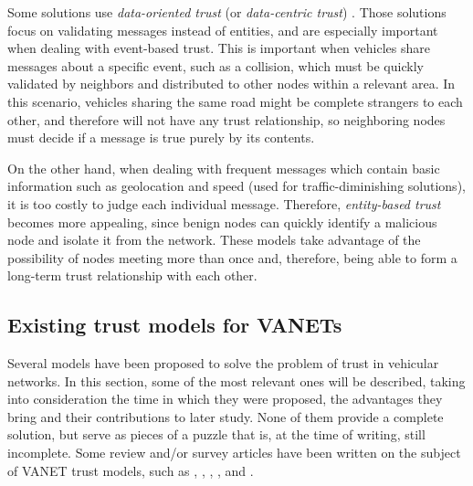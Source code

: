 \documentclass{article}
\begin{document}
Some solutions use \textit{data-oriented trust} (or \textit{data-centric trust}) \cite{raya2008data}.
Those solutions focus on validating messages instead of entities, and are especially important when dealing with event-based trust.
This is important when vehicles share messages about a specific event, such as a collision, which must be quickly validated by neighbors and distributed to other nodes within a relevant area.
In this scenario, vehicles sharing the same road might be complete strangers to each other, and therefore will not have any trust relationship, so neighboring nodes must decide if a message is true purely by its contents.

On the other hand, when dealing with frequent messages which contain basic information such as geolocation and speed (used for traffic-diminishing solutions), it is too costly to judge each individual message.
Therefore, \textit{entity-based trust} becomes more appealing, since benign nodes can quickly identify a malicious node and isolate it from the network.
These models take advantage of the possibility of nodes meeting more than once and, therefore, being able to form a long-term trust relationship with each other.





\subsection{Existing trust models for VANETs}

Several models have been proposed to solve the problem of trust in vehicular networks. 
In this section, some of the most relevant ones will be described, taking into consideration the time in which they were proposed, the advantages they bring and their contributions to later study. 
None of them provide a complete solution, but serve as pieces of a puzzle that is, at the time of writing, still incomplete. 
Some review and/or survey articles have been written on the subject of VANET trust models, such as \cite{zhang2011survey}, \cite{ma2011survey}, \cite{mejri2014survey}, \cite{sengar2016survey}, and \cite{dwivedi2016review}. 
\end{document}
